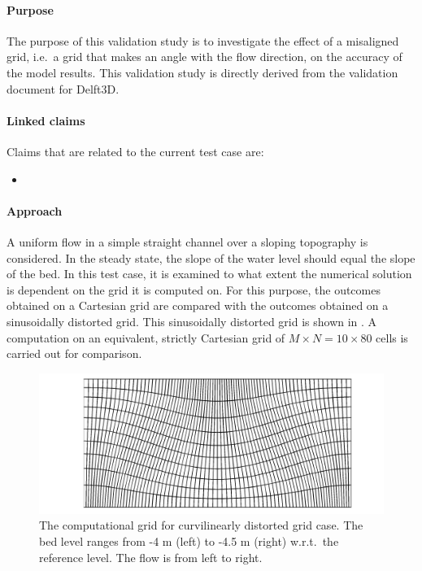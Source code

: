 

\paragraph*{Purpose}
The purpose of this validation study is to investigate the effect of a misaligned grid, i.e.\ a grid that makes an angle with the flow direction, on the accuracy of the model results. This validation study is directly derived from the validation document for Delft3D.


\paragraph*{Linked claims}
Claims that are related to the current test case are:
\begin{itemize}
\item {}
\end{itemize}


\paragraph*{Approach}
A uniform flow in a simple straight channel over a sloping topography is considered. In the steady state, the slope of the water level should equal the slope of the bed. In this test case, it is examined to what extent the numerical solution is dependent on the grid it is computed on. For this purpose, the outcomes obtained on a Cartesian grid are compared with the outcomes obtained on a sinusoidally distorted grid. This sinusoidally distorted grid is shown in . A computation on an equivalent, strictly Cartesian grid of $M \times N = 10 \times 80$ cells is carried out for comparison.

\begin{figure}[h!]
\begin{center}
\includegraphics[width=0.5\columnwidth]{figures/distortedgrid.png}
\end{center}\caption{The computational grid for curvilinearly distorted grid case. The bed level ranges from -4 m (left) to -4.5 m (right) w.r.t.\ the reference level. The flow is from left to right. \label{fig:distortedgrid}}
\end{figure}

